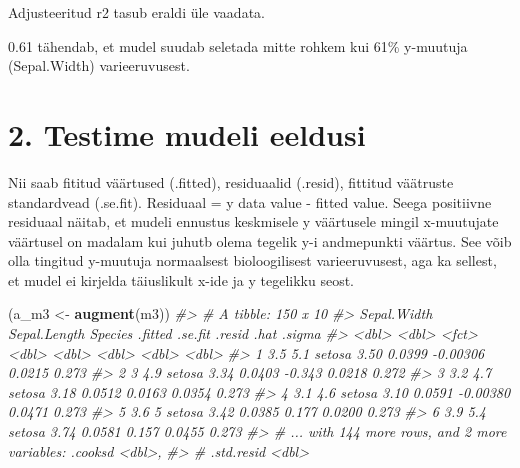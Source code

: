 \documentclass[]{book}
\newenvironment{Shaded}{\begin{snugshade}}{\end{snugshade}}
\newcommand{\CommentTok}[1]{\textcolor[rgb]{0.56,0.35,0.01}{\textit{#1}}}
\newcommand{\KeywordTok}[1]{\textcolor[rgb]{0.13,0.29,0.53}{\textbf{#1}}}
\newcommand{\NormalTok}[1]{#1}
\newcommand{\OperatorTok}[1]{\textcolor[rgb]{0.81,0.36,0.00}{\textbf{#1}}}
\newcommand{\StringTok}[1]{\textcolor[rgb]{0.31,0.60,0.02}{#1}}
\begin{document}
Adjusteeritud r2 tasub eraldi üle vaadata.

\begin{Shaded}
\end{Shaded}

0.61 tähendab, et mudel suudab seletada mitte rohkem kui 61\% y-muutuja (Sepal.Width) varieeruvusest.

\hypertarget{testime-mudeli-eeldusi}{%
\section*{2. Testime mudeli eeldusi}\label{testime-mudeli-eeldusi}}

Nii saab fititud väärtused (.fitted), residuaalid (.resid), fittitud väätruste standardvead (.se.fit). Residuaal = y data value - fitted value. Seega positiivne residuaal näitab, et mudeli ennustus keskmisele y väärtusele mingil x-muutujate väärtusel on madalam kui juhutb olema tegelik y-i andmepunkti väärtus. See võib olla tingitud y-muutuja normaalsest bioloogilisest varieeruvusest, aga ka sellest, et mudel ei kirjelda täiuslikult x-ide ja y tegelikku seost.

\begin{Shaded}
\begin{Highlighting}[]
\NormalTok{(a_m3 <-}\StringTok{ }\KeywordTok{augment}\NormalTok{(m3))}
\CommentTok{#> # A tibble: 150 x 10}
\CommentTok{#>   Sepal.Width Sepal.Length Species .fitted .se.fit   .resid   .hat .sigma}
\CommentTok{#>         <dbl>        <dbl> <fct>     <dbl>   <dbl>    <dbl>  <dbl>  <dbl>}
\CommentTok{#> 1         3.5          5.1 setosa     3.50  0.0399 -0.00306 0.0215  0.273}
\CommentTok{#> 2         3            4.9 setosa     3.34  0.0403 -0.343   0.0218  0.272}
\CommentTok{#> 3         3.2          4.7 setosa     3.18  0.0512  0.0163  0.0354  0.273}
\CommentTok{#> 4         3.1          4.6 setosa     3.10  0.0591 -0.00380 0.0471  0.273}
\CommentTok{#> 5         3.6          5   setosa     3.42  0.0385  0.177   0.0200  0.273}
\CommentTok{#> 6         3.9          5.4 setosa     3.74  0.0581  0.157   0.0455  0.273}
\CommentTok{#> # ... with 144 more rows, and 2 more variables: .cooksd <dbl>,}
\CommentTok{#> #   .std.resid <dbl>}
\end{Highlighting}
\end{Shaded}
\end{document}
